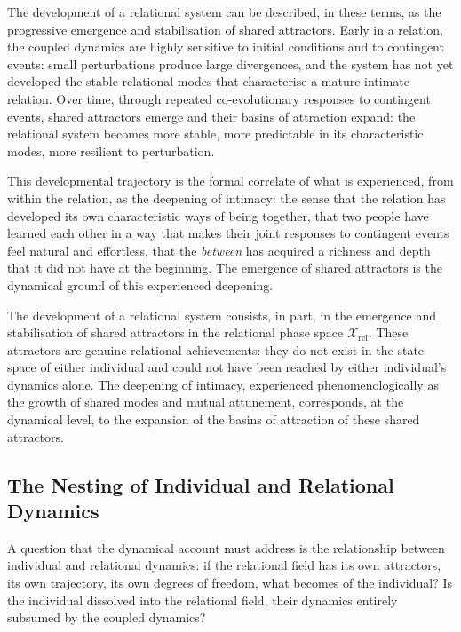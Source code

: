 The development of a relational system can be described, in these terms, as the progressive emergence and stabilisation of shared attractors. Early in a relation, the coupled dynamics are highly sensitive to initial conditions and to contingent events: small perturbations produce large divergences, and the system has not yet developed the stable relational modes that characterise a mature intimate relation. Over time, through repeated co-evolutionary responses to contingent events, shared attractors emerge and their basins of attraction expand: the relational system becomes more stable, more predictable in its characteristic modes, more resilient to perturbation.

This developmental trajectory is the formal correlate of what is experienced, from within the relation, as the deepening of intimacy: the sense that the relation has developed its own characteristic ways of being together, that two people have learned each other in a way that makes their joint responses to contingent events feel natural and effortless, that the \emph{between} has acquired a richness and depth that it did not have at the beginning. The emergence of shared attractors is the dynamical ground of this experienced deepening.

\begin{claim}
The development of a relational system consists, in part, in the emergence and stabilisation of shared attractors in the relational phase space $\mathcal{X}_{\mathrm{rel}}$. These attractors are genuine relational achievements: they do not exist in the state space of either individual and could not have been reached by either individual's dynamics alone. The deepening of intimacy, experienced phenomenologically as the growth of shared modes and mutual attunement, corresponds, at the dynamical level, to the expansion of the basins of attraction of these shared attractors.
\end{claim}

\subsection{The Nesting of Individual and Relational Dynamics}
\label{p14:subsec:nesting}

\noindent
A question that the dynamical account must address is the relationship between individual and relational dynamics: if the relational field has its own attractors, its own trajectory, its own degrees of freedom, what becomes of the individual? Is the individual dissolved into the relational field, their dynamics entirely subsumed by the coupled dynamics?

